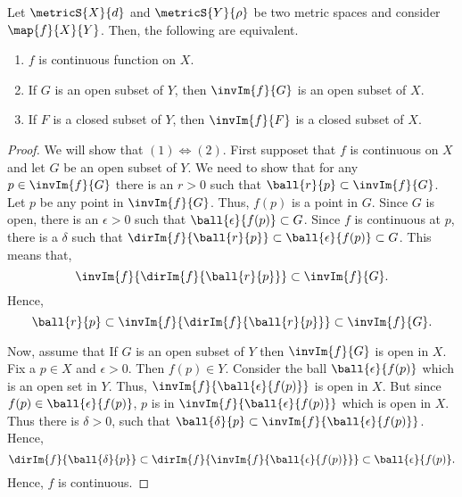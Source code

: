 \begin{Theorem}
    Let $\metricS{X}{d}$ and $\metricS{Y}{\rho}$ be two metric spaces and consider $\map{f}{X}{Y}$. Then, the
    following are equivalent.
    \begin{enumerate}
	\item
	    $f$ is continuous function on $X$.
	\item
	    If $G$ is an open subset of $Y$, then $\invIm{f}{G}$ is an open subset of $X$.
	\item
	    If $F$ is a closed subset of $Y$, then $\invIm{f}{F}$ is a closed subset of $X$.
    \end{enumerate}
\end{Theorem}
\begin{proof}
    We will show that $(1) \iff (2)$. First supposet that $f$ is continuous on $X$ and let $G$ be an open
    subset of $Y$. We need to show that for any $p \in \invIm{f}{G}$ 
    there is an $r > 0$ such that $\ball{r}{p} \subset \invIm{f}{G}$. Let $p$ be any point in $\invIm{f}{G}$.
    Thus, $f(p)$ is a point in $G$. Since $G$ is open, there is an $\epsilon > 0$ such that 
    $\ball{\epsilon}{f(p)}\subset G$. Since $f$ is continuous at $p$, there is a $\delta$ such that
    $\dirIm{f}{\ball{r}{p}} \subset \ball{\epsilon}{f(p)}\subset G$. This means that,
    \[\invIm{f}{\dirIm{f}{\ball{r}{p}}} \subset \invIm{f}{G}.\]
    Hence,
    \[\ball{r}{p} \subset \invIm{f}{\dirIm{f}{\ball{r}{p}}} \subset \invIm{f}{G}. \]

    Now, assume that If $G$ is an open subset of $Y$ then $\invIm{f}{G}$ is open in $X$. Fix a $p \in X$ and
    $\epsilon > 0$. Then $f(p) \in Y$. Consider the ball $\ball{\epsilon}{f(p)}$ which is an open set in $Y$.
    Thus, $\invIm{f}{\ball{\epsilon}{f(p)}}$ is open in $X$. But since $f(p) \in \ball{\epsilon}{f(p)}$, $p$
    is in $\invIm{f}{\ball{\epsilon}{f(p)}}$ which is open in $X$. Thus there is $\delta > 0$, such that
    $\ball{\delta}{p} \subset \invIm{f}{\ball{\epsilon}{f(p)}}$. Hence,
    \[\dirIm{f}{\ball{\delta}{p}} \subset \dirIm{f}{\invIm{f}{\ball{\epsilon}{f(p)}}} \subset 
	\ball{\epsilon}{f(p)}.\]
    Hence, $f$ is continuous.

\end{proof}


